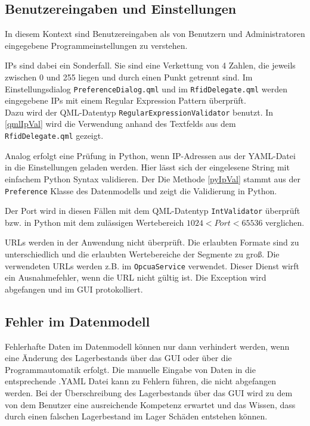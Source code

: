 \subsection{Benutzereingaben und Einstellungen}

In diesem Kontext sind Benutzereingaben als von Benutzern und Administratoren eingegebene Programmeinstellungen zu verstehen. 

IPs sind dabei ein Sonderfall. Sie sind eine Verkettung von 4 Zahlen, die jeweils zwischen 0 und 255 liegen und durch einen Punkt getrennt sind.
Im Einstellungsdialog \verb|PreferenceDialog.qml| und im \verb|RfidDelegate.qml| werden eingegebene IPs mit einem 
Regular Expression Pattern überprüft. \\
Dazu wird der QML-Datentyp \verb|RegularExpressionValidator| benutzt. 
In \ref{qmlIpVal} wird die Verwendung anhand des Textfelds aus dem \verb|RfidDelegate.qml| gezeigt.

Analog erfolgt eine Prüfung in Python, wenn IP-Adressen aus der YAML-Datei in die Einstellungen geladen werden.
Hier lässt sich der eingelesene String mit einfachem Python Syntax validieren. 
Der Die Methode \ref{pyIpVal} stammt aus der \verb|Preference| Klasse des Datenmodells und zeigt die Validierung in Python.





Der Port wird in diesen Fällen mit dem QML-Datentyp \verb|IntValidator| überprüft bzw. in Python mit dem zulässigen Wertebereich
$1024< Port < 65536$ verglichen.

URLs werden in der Anwendung nicht überprüft. 
Die erlaubten Formate sind zu unterschiedlich und die erlaubten Wertebereiche der Segmente zu groß.
Die verwendeten URLs werden z.B. im \verb|OpcuaService| verwendet. Dieser Dienst wirft ein Ausnahmefehler, wenn die URL nicht gültig ist. 
Die Exception wird abgefangen und im GUI protokolliert. 

\subsection{Fehler im Datenmodell}

Fehlerhafte Daten im Datenmodell können nur dann verhindert werden, wenn eine Änderung des Lagerbestands über das GUI oder über die 
Programmautomatik erfolgt.
Die manuelle Eingabe von Daten in die entsprechende .YAML Datei kann zu Fehlern führen, die nicht abgefangen werden.
Bei der Überschreibung des Lagerbestands über das GUI wird zu dem von dem Benutzer eine ausreichende Kompetenz erwartet und das Wissen, 
dass durch einen falschen Lagerbestand im Lager Schäden entstehen können. 

